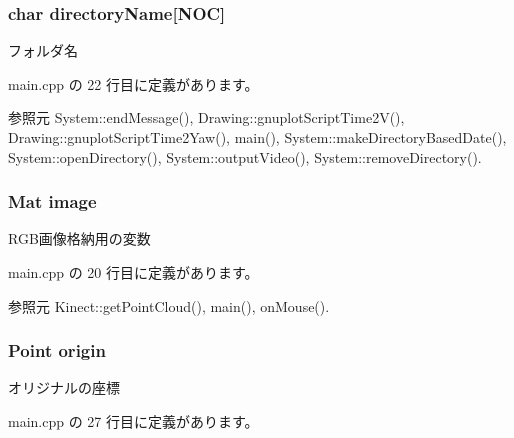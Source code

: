 \subsubsection[{directory\-Name}]{\setlength{\rightskip}{0pt plus 5cm}char directory\-Name[{\bf N\-O\-C}]}\label{_path_tracking_and_induction_of_the_robot_8hpp_abefb498e9a643f68bb3d37c22953ddad}


フォルダ名 



 main.\-cpp の 22 行目に定義があります。



参照元 System\-::end\-Message(), Drawing\-::gnuplot\-Script\-Time2\-V(), Drawing\-::gnuplot\-Script\-Time2\-Yaw(), main(), System\-::make\-Directory\-Based\-Date(), System\-::open\-Directory(), System\-::output\-Video(), System\-::remove\-Directory().

\subsubsection[{image}]{\setlength{\rightskip}{0pt plus 5cm}Mat image}\label{_path_tracking_and_induction_of_the_robot_8hpp_aabb27b8973575043030df51be47cd24a}


R\-G\-B画像格納用の変数 



 main.\-cpp の 20 行目に定義があります。



参照元 Kinect\-::get\-Point\-Cloud(), main(), on\-Mouse().

\subsubsection[{origin}]{\setlength{\rightskip}{0pt plus 5cm}Point origin}\label{_path_tracking_and_induction_of_the_robot_8hpp_a903d0d8820c696aaa1170c50deb3633f}


オリジナルの座標 



 main.\-cpp の 27 行目に定義があります。



